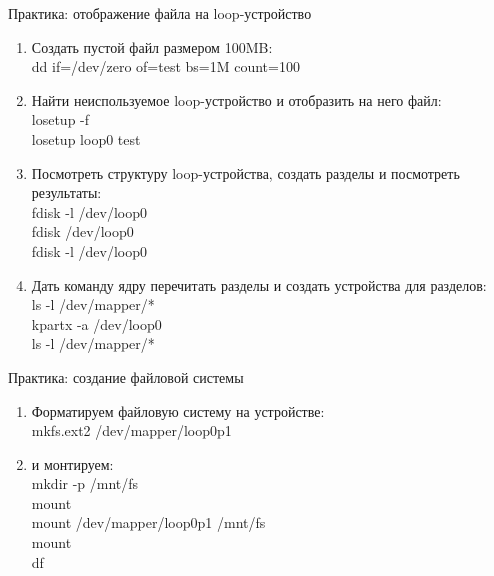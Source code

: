 \documentclass[ignorenonframetext, professionalfonts, hyperref={pdftex, unicode}]{beamer}
\begin{document}
\begin{frame}{Практика: отображение файла на loop-устройство}
	\begin{enumerate}
		\item Создать пустой файл размером 100MB: \\
			dd if=/dev/zero of=test bs=1M count=100
			\pause
		\item Найти неиспользуемое loop-устройство и отобразить на него файл:\\
			losetup -f \\
			losetup loop0 test
			\pause
		\item Посмотреть структуру loop-устройства, создать разделы и посмотреть результаты:\\
			fdisk -l /dev/loop0 \\
			fdisk /dev/loop0 \\
			fdisk -l /dev/loop0
			\pause
		\item Дать команду ядру перечитать разделы и создать устройства для разделов:\\
			ls -l /dev/mapper/* \\
			kpartx -a /dev/loop0 \\
			ls -l /dev/mapper/* \\
	\end{enumerate}
\end{frame}

\begin{frame}{Практика: создание файловой системы}
	\begin{enumerate}
		\item Форматируем файловую систему на устройстве: \\
			mkfs.ext2 /dev/mapper/loop0p1
			\pause
		\item и монтируем:\\
			mkdir -p /mnt/fs\\
			mount\\
			mount /dev/mapper/loop0p1 /mnt/fs\\
			mount\\
			df
			\pause
	\end{enumerate}
\end{frame}
\end{document}
